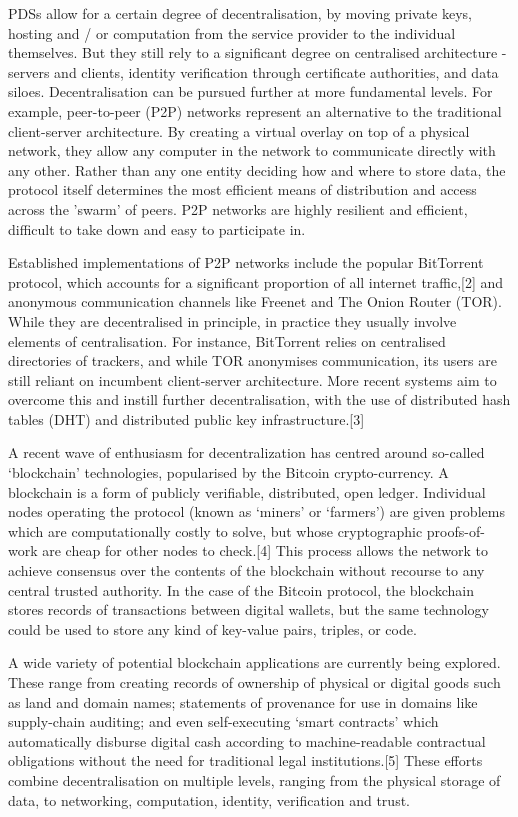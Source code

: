 \documentclass{acm_proc_article-sp}
\begin{document}
PDSs allow for a certain degree of decentralisation, by moving private keys, hosting and / or computation from the service provider to the individual themselves. But they still rely to a significant degree on centralised architecture - servers and clients, identity verification through certificate authorities, and data siloes. Decentralisation can be pursued further at more fundamental levels. For example, peer-to-peer (P2P) networks represent an alternative to the traditional client-server architecture. By creating a virtual overlay on top of a physical network, they allow any computer in the network to communicate directly with any other. Rather than any one entity deciding how and where to store data, the protocol itself determines the most efficient means of distribution and access across the 'swarm' of peers. P2P networks are highly resilient and efficient, difficult to take down and easy to participate in.
 
Established implementations of P2P networks include the popular BitTorrent protocol, which accounts for a significant proportion of all internet traffic,[2] and anonymous communication channels like Freenet and The Onion Router (TOR). While they are decentralised in principle, in practice they usually involve elements of centralisation. For instance, BitTorrent relies on centralised directories of trackers, and while TOR anonymises communication, its users are still reliant on incumbent client-server architecture. More recent systems aim to overcome this and instill further decentralisation, with the use of distributed hash tables (DHT) and distributed public key infrastructure.[3]
 
A recent wave of enthusiasm for decentralization has centred around so-called ‘blockchain’ technologies, popularised by the Bitcoin crypto-currency. A blockchain is a form of publicly verifiable, distributed, open ledger. Individual nodes operating the protocol (known as ‘miners’ or ‘farmers’) are given problems which are computationally costly to solve, but whose cryptographic proofs-of-work are cheap for other nodes to check.[4] This process allows the network to achieve consensus over the contents of the blockchain without recourse to any central trusted authority. In the case of the Bitcoin protocol, the blockchain stores records of transactions between digital wallets, but the same technology could be used to store any kind of key-value pairs, triples, or code.
 
A wide variety of potential blockchain applications are currently being explored. These range from creating records of ownership of physical or digital goods such as land and domain names; statements of provenance for use in domains like supply-chain auditing; and even self-executing ‘smart contracts’ which automatically disburse digital cash according to machine-readable contractual obligations without the need for traditional legal institutions.[5] These efforts combine decentralisation on multiple levels, ranging from the physical storage of data, to networking, computation, identity, verification and trust.
 
\end{document}
